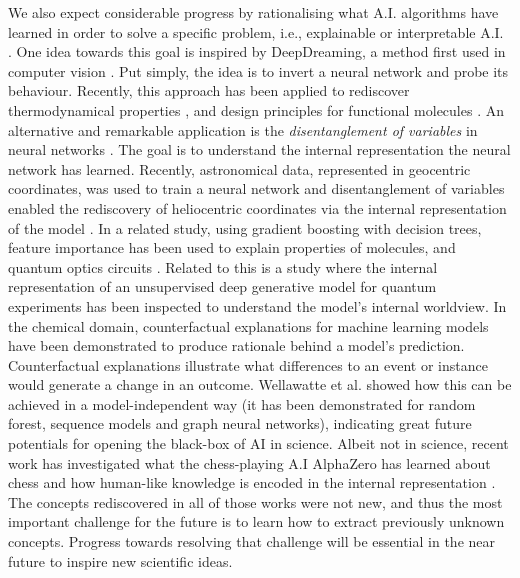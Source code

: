  We also expect considerable progress by rationalising what A.I. algorithms have learned in order to solve a specific problem, i.e., explainable or interpretable A.I. \cite{montavon2018methods,samek2019explainable,roscher2020explainable,lundberg2020local}. One idea towards this goal is inspired by DeepDreaming, a method first used in computer vision \cite{mahendran2015understanding,mordvintsev2015inceptionism}. Put simply, the idea is to invert a neural network and probe its behaviour. Recently, this approach has been applied to rediscover thermodynamical properties \cite{seif2020machine}, and design principles for functional molecules \cite{shen2020deep}. An alternative and remarkable application is the \textit{disentanglement of variables} in neural networks \cite{burgess2018understanding}. The goal is to understand the internal representation the neural network has learned. Recently, astronomical data, represented in geocentric coordinates, was used to train a neural network and disentanglement of variables enabled the rediscovery of heliocentric coordinates via the internal representation of the model \cite{iten2020discovering}. In a related study, using gradient boosting with decision trees, feature importance has been used to explain properties of molecules, and quantum optics circuits \cite{friederich2021scientific}. Related to this is a study where the internal representation of an unsupervised deep generative model for quantum experiments has been inspected to understand the model's internal worldview\cite{flam2021learning}. In the chemical domain, counterfactual explanations for machine learning models have been demonstrated to produce rationale behind a model's prediction. Counterfactual explanations illustrate what differences to an event or instance would generate a change in an outcome. Wellawatte et al. \cite{wellawatte2022model} showed how this can be achieved in a model-independent way (it has been demonstrated for random forest, sequence models and graph neural networks), indicating great future potentials for opening the black-box of AI in science. Albeit not in science, recent work has investigated what the chess-playing A.I AlphaZero has learned about chess and how human-like knowledge is encoded in the internal representation \cite{mcgrath2021acquisition}. The concepts rediscovered in all of those works were not new, and thus the most important challenge for the future is to learn how to extract previously unknown concepts. Progress towards resolving that challenge will be essential in the near future to inspire new scientific ideas.


